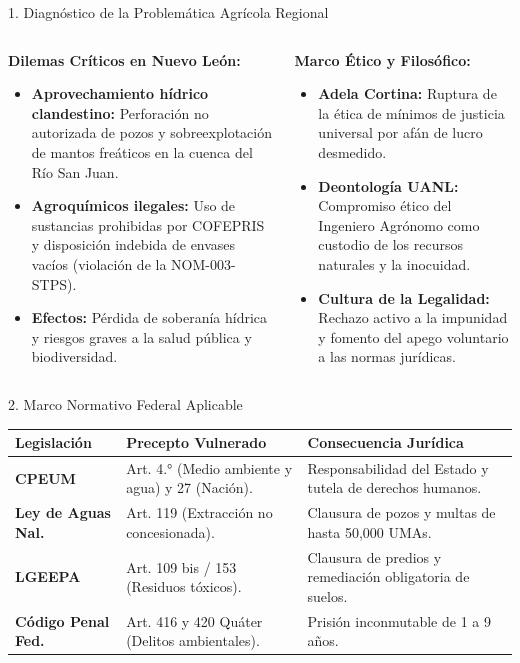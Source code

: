 \documentclass[
  spanish,
  aspectratio=169,
  xcolor={dvipsnames,table}
]{beamer}
\begin{document}
\begin{frame}{1. Diagnóstico de la Problemática Agrícola Regional}
  \begin{columns}[T]
    \begin{column}{0.48\textwidth}
      \textbf{\color{uanlblue}Dilemas Críticos en Nuevo León:}
      \begin{itemize}
        \item \textbf{Aprovechamiento hídrico clandestino:} Perforación no autorizada de pozos y sobreexplotación de mantos freáticos en la cuenca del Río San Juan.
        \item \textbf{Agroquímicos ilegales:} Uso de sustancias prohibidas por COFEPRIS y disposición indebida de envases vacíos (violación de la NOM-003-STPS).
        \item \textbf{Efectos:} Pérdida de soberanía hídrica y riesgos graves a la salud pública y biodiversidad.
      \end{itemize}
    \end{column}
    \begin{column}{0.48\textwidth}
      \textbf{\color{uanlblue}Marco Ético y Filosófico:}
      \begin{itemize}
        \item \textbf{Adela Cortina:} Ruptura de la ética de mínimos de justicia universal por afán de lucro desmedido.
        \item \textbf{Deontología UANL:} Compromiso ético del Ingeniero Agrónomo como custodio de los recursos naturales y la inocuidad.
        \item \textbf{Cultura de la Legalidad:} Rechazo activo a la impunidad y fomento del apego voluntario a las normas jurídicas.
      \end{itemize}
    \end{column}
  \end{columns}
\end{frame}

\begin{frame}{2. Marco Normativo Federal Aplicable}
  \begin{table}[h!]
    \centering
    \footnotesize
    \begin{tabularx}{\textwidth}{lYY}
      \toprule
      \textbf{Legislación} & \textbf{Precepto Vulnerado} & \textbf{Consecuencia Jurídica} \\
      \midrule
      \textbf{CPEUM} & Art. 4.° (Medio ambiente y agua) y 27 (Nación). & Responsabilidad del Estado y tutela de derechos humanos. \\
      \textbf{Ley de Aguas Nal.} & Art. 119 (Extracción no concesionada). & Clausura de pozos y multas de hasta 50,000 UMAs. \\
      \textbf{LGEEPA} & Art. 109 bis / 153 (Residuos tóxicos). & Clausura de predios y remediación obligatoria de suelos. \\
      \textbf{Código Penal Fed.} & Art. 416 y 420 Quáter (Delitos ambientales). & Prisión inconmutable de 1 a 9 años. \\
      \bottomrule
    \end{tabularx}
  \end{table}
\end{frame}
\end{document}
